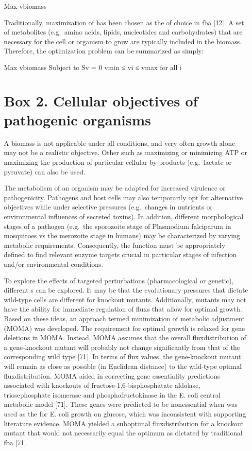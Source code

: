 Max vbiomass

Traditionally, maximization of  has been 
chosen as the  of choice in \gls{fba} [12]. A set 
of metabolites (e.g.\ amino acids, lipids, nucleotides and 
carbohydrates) that are necessary for the cell or organism 
to grow are typically included in the \gls{biomass}. 
Therefore, the optimization problem can be summarized as simply:

Max vbiomass
Subject to	Sv = 0
vmin ≤ vi ≤ vmax	 for all i

\section{Box 2. Cellular objectives of pathogenic organisms}
A \gls{biomass} is not applicable under 
all conditions, and very often growth alone may not be 
a realistic objective. Other  such as maximizing 
or minimizing ATP or maximizing the production of 
particular cellular by-products (e.g.\ lactate or pyruvate) 
can also be used.

The metabolism of an organism may be adapted for increased 
virulence or pathogenicity. Pathogens and host cells may 
also temporarily opt for alternative objectives while under 
selective pressures (e.g.\ changes in nutrients or 
environmental influences of secreted toxins). In addition, 
different morphological stages of a pathogen (e.g.\ the sporozoite 
stage of Plasmodium falciparum in mosquitoes vs the merozoite 
stage in humans) may be characterized by varying metabolic 
requirements. Consequently, the  function must be 
appropriately defined to find relevant enzyme targets crucial 
in particular stages of infection and/or environmental conditions.

To explore the effects of targeted perturbations 
(pharmacological or genetic), different s 
can be explored. It may be that the evolutionary 
pressures that dictate wild-type cells are different 
for knockout mutants. Additionally, mutants may 
not have the ability for immediate regulation of 
\glspl{flux} that allow for optimal growth. Based on these 
ideas, an approach termed minimization of metabolic 
adjustment (MOMA) was developed. The requirement for 
optimal growth is relaxed for gene deletions in MOMA. 
Instead, MOMA assumes that the overall \gls{fluxdistribution} 
of a gene-knockout mutant will probably not change 
significantly from that of the corresponding wild type [71]. 
In terms of \gls{flux} values, the gene-knockout mutant will 
remain as close as possible (in Euclidean distance) to 
the wild-type optimal \gls{fluxdistribution}. MOMA aided in correcting 
gene essentiality predictions associated with knockouts 
of fructose-1,6-bisphosphatate aldolase, triosephosphate 
isomerase and phosphofructokinase in the E. coli 
central metabolic model [71]. These genes were predicted 
to be nonessential when  was used as the  
for E. coli growth on glucose, which was inconsistent with 
supporting literature evidence. MOMA yielded a suboptimal 
\gls{fluxdistribution} for a knockout mutant that would not 
necessarily equal the optimum as dictated by traditional 
\gls{fba} [71].

